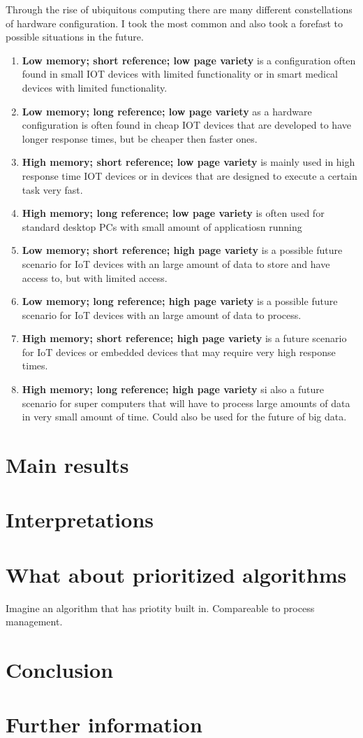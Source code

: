 \documentclass[12pt, reqno]{amsart}
\numberwithin{equation}{section}
\begin{document}
Through the rise of ubiquitous computing there are many different constellations of hardware configuration.
I took the most common and also took a forefast to possible situations in the future.
\begin{enumerate}
    \item \textbf{Low memory; short reference; low page variety} is a configuration often found in small IOT devices 
    with limited functionality or in smart medical devices with limited functionality.
    \item \textbf{Low memory; long reference; low page variety} as a hardware configuration is often found in cheap IOT devices 
    that are developed to have longer response times, but be cheaper then faster ones.
    \item \textbf{High memory; short reference; low page variety} is mainly used in high response time
    IOT devices or in devices that are designed to execute a certain task very fast.
    \item \textbf{High memory; long reference; low page variety} is often used for standard desktop PCs with small amount of applicatiosn running
    \item \textbf{Low memory; short reference; high page variety} is a possible future scenario for IoT devices with an large amount of data to store and have access to, but with
    limited access.
    \item \textbf{Low memory; long reference; high page variety} is a possible future scenario for IoT devices with an large amount of
    data to process.
    \item \textbf{High memory; short reference; high page variety} is a future scenario for IoT devices or embedded devices that
    may require very high response times.
    \item \textbf{High memory; long reference; high page variety} si also a future scenario for super computers that will have to
    process large amounts of data in very small amount of time. Could also be used for the future of big data.
\end{enumerate}    


\section{Main results}


\section{Interpretations}

\section{What about prioritized algorithms}
Imagine an algorithm that has priotity built in. Compareable to process management.

\section{Conclusion}

\section{Further information}
\end{document}
